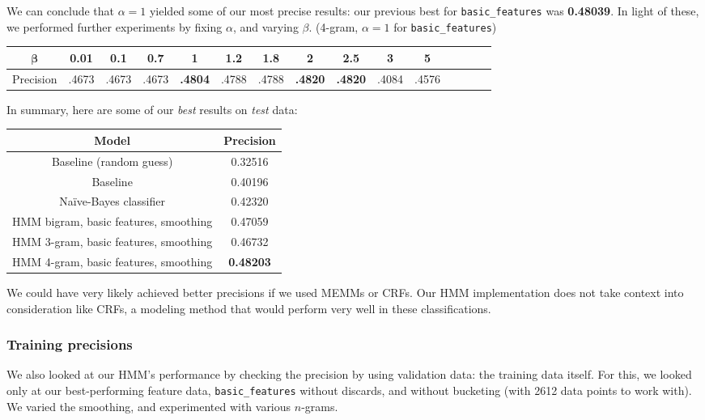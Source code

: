 \documentclass{article}
\begin{document}
We can conclude that $\alpha = 1$ yielded some of our most precise results: our previous best for \texttt{basic\_features} was \textbf{0.48039}. In light of these, we performed further experiments by fixing $\alpha$, and varying $\beta$. (4-gram, $\alpha = 1$ for \texttt{basic\_features})\par\bigskip

{\small\begin{tabular}{|c|c|c|c|c|c|c|c|c|c|c|c|c|c|c|}\hline
$\bm{\beta}$ & 0.01 & 0.1 & 0.7 & 1 & 1.2 & 1.8 & 2 & 2.5 & 3 & 5\\\hline
Precision & .4673 & .4673 & .4673 & \textbf{.4804} & .4788 & .4788
& \textbf{.4820} & \textbf{.4820} & .4084 & .4576\\\hline
\end{tabular}}\par\bigskip

In summary, here are some of our \emph{best} results on \emph{test} data:\par\bigskip
\begin{tabular}{|c|c|}\hline
Model                      & Precision\\\hline
Baseline (random guess)    & 0.32516\\
Baseline                   & 0.40196\\
Na\"{i}ve-Bayes classifier & 0.42320\\
HMM bigram, basic features, smoothing & 0.47059\\
HMM 3-gram, basic features, smoothing & 0.46732\\
HMM 4-gram, basic features, smoothing & \textbf{0.48203}\\\hline
\end{tabular}\par\medskip

We could have very likely achieved better precisions if we used MEMMs or CRFs. Our HMM implementation does not take context into consideration like CRFs, a modeling method that would perform very well in these classifications.

\subsubsection{Training precisions}
We also looked at our HMM's performance by checking the precision by using validation data: the training data itself. For this, we looked only at our best-performing feature data, \texttt{basic\_features} without discards, and without bucketing (with 2612 data points to work with). We varied the smoothing, and experimented with various $n$-grams.\par\medskip
\end{document}
